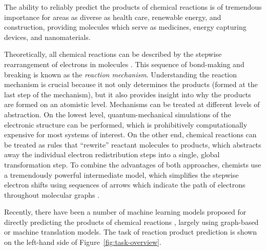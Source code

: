 
The ability to reliably predict the products of chemical reactions is of tremendous importance for areas as diverse as health care, renewable energy, and construction, providing molecules which serve as medicines, energy capturing devices, and nanomaterials. 

Theoretically, all chemical reactions can be described by the stepwise rearrangement of electrons in molecules \cite{herges1994organizing}. 
This sequence of bond-making and breaking is known as the \emph{reaction mechanism}. 
Understanding the reaction mechanism is crucial because it not only determines the products (formed at the last step of the mechanism), 
but it also provides insight into why the products are formed on an atomistic level. 
%
Mechanisms can be treated at different levels of abstraction. 
On the lowest level, quantum-mechanical simulations of the electronic structure can be performed, which is prohibitively computationally expensive for most systems of interest. 
On the other end, chemical reactions can be treated as rules that ``rewrite'' reactant molecules to products, which abstracts away the individual electron redistribution steps into a single, global transformation step. 
To combine the advantages of both approaches, chemists use a tremendously powerful intermediate model, which simplifies the stepwise electron shifts using sequences of arrows which indicate the path of electrons throughout molecular graphs \cite{herges1994organizing}. 

Recently, there have been a number of machine learning models proposed for directly predicting the products of chemical reactions \cite{coley2017prediction,jin2017predicting,schwaller2017found,neural-symbolic,segler2018planning,wei2016neural}, largely using graph-based or machine translation models. 
The task of reaction product prediction is shown on the left-hand side of Figure~\ref{fig:task-overview}. 

